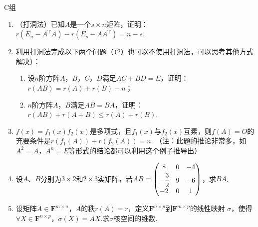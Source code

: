 \centerline{\heiti C组}
\begin{enumerate}
    \item （打洞法）已知$A$是一个$s \times n$矩阵，证明：$r(E_n-A^\mathrm{T}A)-r(E_s-AA^\mathrm{T})=n-s$.
	\item 利用打洞法完成以下两个问题（（2）也可以不使用打洞法，可以思考其他方式解决）：
	\begin{enumerate}
        \item 设$n$阶方阵$A$，$B$，$C$，$D$满足$AC+BD=E$，证明：$r(AB) = r(A)+r(B)-n$；
        \item $n$阶方阵$A$，$B$满足$AB=BA$，证明：$r(AB)+r(A+B)\le r(A)+r(B)$.
    \end{enumerate}
	\item $f(x)=f_1(x)f_2(x)$是多项式，且$f_1(x)$与$f_2(x)$互素，则$f(A)=O$的充要条件是$r(f_1(A))+r(f_2(A))=n$.
	（注：此题的推论非常多，如$A^2=A$，$A^n=E$等形式的结论都可以利用这个例子推导出）
	\item 设$A$、$B$分别为$3 \times 2$和$2 \times 3$实矩阵，若$AB=\begin{pmatrix}
		8 & 0 & -4 \\ -\cfrac{3}{2} & 9 & -6 \\ -2 & 0 & 1
	\end{pmatrix}$，求$BA$.
    \item 设矩阵$A \in \mathbf{F}^{m \times n}$，$A$的秩$r(A)=r$，定义$\mathbf{F}^{n \times p}$到$\mathbf{F}^{m \times p}$的线性映射
	$\sigma$，使得$\forall X \in \mathbf{F}^{n \times p}$，$\sigma(X)=AX$.求$\sigma$核空间的维数.
\end{enumerate}
